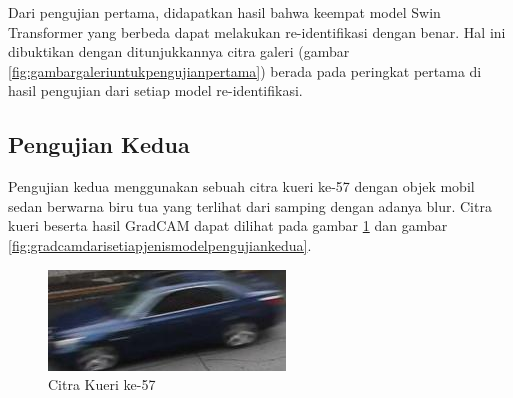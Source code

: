 Dari pengujian pertama, didapatkan hasil bahwa keempat model Swin Transformer yang berbeda dapat melakukan re-identifikasi 
dengan benar. Hal ini dibuktikan dengan ditunjukkannya citra galeri (gambar \ref{fig:gambargaleriuntukpengujianpertama})
berada pada peringkat pertama di hasil pengujian dari setiap model re-identifikasi.

\subsection{Pengujian Kedua}

Pengujian kedua menggunakan sebuah citra kueri ke-57 dengan objek mobil sedan \linebreak berwarna biru tua yang terlihat dari samping 
dengan adanya blur. Citra kueri beserta hasil GradCAM dapat dilihat pada gambar \ref{fig:gambarkueriuntukpengujiankedua} dan 
gambar \ref{fig:gradcamdarisetiapjenismodelpengujiankedua}.

\begin{figure}[h!]
  \centering
  \includegraphics[scale=0.75]{gambar/Que57_1112.jpg}
  \caption{Citra Kueri ke-57}
  \label{fig:gambarkueriuntukpengujiankedua}
\end{figure}

